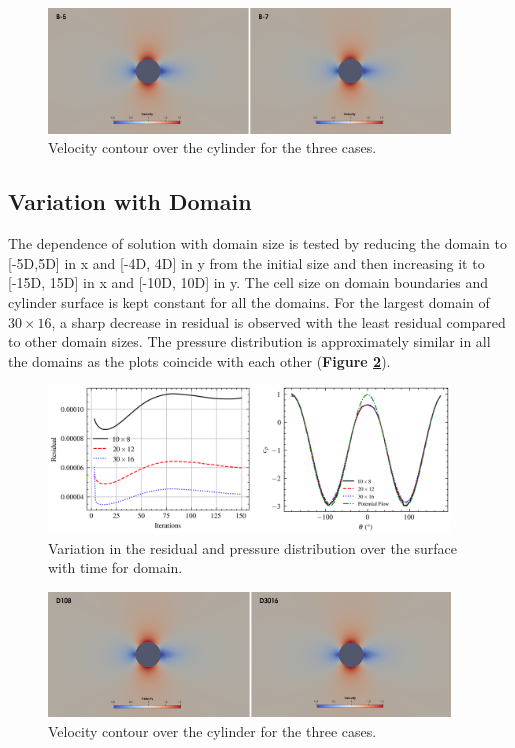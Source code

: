 \documentclass{article}
\begin{document}
\begin{figure}[H]
    \centering
    \includegraphics[width=0.95\textwidth]{../cyl_b.png}
    \caption{Velocity contour over the cylinder for the three cases.}
    \label{fig:cyl_b}
\end{figure}

\subsection{Variation with Domain}
The dependence of solution with domain size is tested by reducing the domain to [-5D,5D] in x and [-4D, 4D] in y from the initial size
and then increasing it to [-15D, 15D] in x and [-10D, 10D] in y. The cell size on domain boundaries and cylinder surface is kept constant
for all the domains. For the largest domain of $30\times16$, a sharp decrease in residual is observed with the least residual compared to
other domain sizes. The pressure distribution is approximately similar in all the domains as the plots coincide with each other
(\textbf{Figure \ref{fig:d}}).

\begin{figure}[H]
    \centering
    \includegraphics[width=0.95\textwidth]{../d.png}
    \caption{Variation in the residual and pressure distribution over the surface with time for domain.}
    \label{fig:d}
\end{figure}

\begin{figure}[H]
    \centering
    \includegraphics[width=0.95\textwidth]{../cyl_d.png}
    \caption{Velocity contour over the cylinder for the three cases.}
    \label{fig:cyl_d}
\end{figure}
\end{document}

